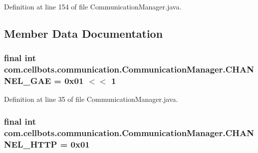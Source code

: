 Definition at line 154 of file Communication\-Manager.\-java.



\subsection{Member Data Documentation}
\hypertarget{classcom_1_1cellbots_1_1communication_1_1_communication_manager_af99bd8872667d307699cf6ca751a995a}{
\subsubsection[{C\-H\-A\-N\-N\-E\-L\-\_\-\-G\-A\-E}]{\setlength{\rightskip}{0pt plus 5cm}final int {\bf com.\-cellbots.\-communication.\-Communication\-Manager.\-C\-H\-A\-N\-N\-E\-L\-\_\-\-G\-A\-E} = 0x01 $<$$<$ 1}}\label{classcom_1_1cellbots_1_1communication_1_1_communication_manager_af99bd8872667d307699cf6ca751a995a}


Definition at line 35 of file Communication\-Manager.\-java.

\hypertarget{classcom_1_1cellbots_1_1communication_1_1_communication_manager_a050372ed3661baedb8e8811b3c172121}{
\subsubsection[{C\-H\-A\-N\-N\-E\-L\-\_\-\-H\-T\-T\-P}]{\setlength{\rightskip}{0pt plus 5cm}final int {\bf com.\-cellbots.\-communication.\-Communication\-Manager.\-C\-H\-A\-N\-N\-E\-L\-\_\-\-H\-T\-T\-P} = 0x01}}\label{classcom_1_1cellbots_1_1communication_1_1_communication_manager_a050372ed3661baedb8e8811b3c172121}


